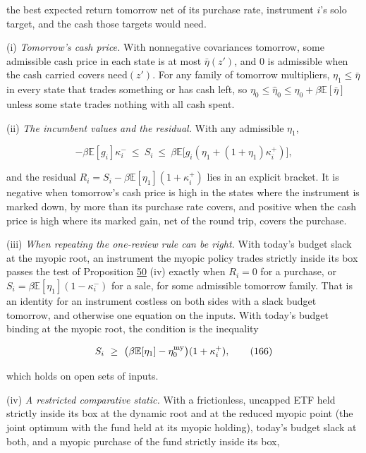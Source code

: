 \documentclass[11pt]{article}
\begin{document}
the best expected return tomorrow net of its purchase rate, instrument
\(i\)'s solo target, and the cash those targets would need.

(i) \emph{Tomorrow's cash price.} With nonnegative covariances tomorrow, some
admissible cash price in each state is at most \(\bar\eta(z')\), and \(0\) is
admissible when the cash carried covers \(\mathrm{need}(z')\). For any family of
tomorrow multipliers, \(\eta_1\leq\bar\eta\) in every state that trades something
or has cash left, so \(\eta_0\leq\hat\eta_0\leq\eta_0+\beta\mathbb E[\bar\eta]\) unless some state trades
nothing with all cash spent.

(ii) \emph{The incumbent values and the residual.} With any admissible \(\eta_1\),

\begin{equation*}
-\beta\mathbb E[g_i]\kappa^-_i\ \leq\ S_i\ \leq\ \beta\mathbb E\bigl[g_i(\eta_1+(1+\eta_1)\kappa^+_i)\bigr],\tag{165}\label{eq:165}
\end{equation*}

and the residual \(R_i=S_i-\beta\mathbb E[\eta_1](1+\kappa^+_i)\) lies in an explicit bracket.
It is negative when tomorrow's cash price is high in the states where
the instrument is marked down, by more than its purchase rate covers,
and positive when the cash price is high where its marked gain, net of
the round trip, covers the purchase.

(iii) \emph{When repeating the one-review rule can be right.} With today's
budget slack at the myopic root, an instrument the myopic policy trades
strictly inside its box passes the test of Proposition \hyperref[res:Proposition-50]{50} (iv) exactly
when \(R_i=0\) for a purchase, or \(S_i=\beta\mathbb E[\eta_1](1-\kappa^-_i)\) for a sale, for some
admissible tomorrow family. That is an identity for an instrument
costless on both sides with a slack budget tomorrow, and otherwise one
equation on the inputs. With today's budget binding at the myopic root,
the condition is the inequality

\begin{equation*}
S_i\ \geq\ \bigl(\beta\mathbb E[\eta_1]-\eta_0^{\rm my}\bigr)(1+\kappa^+_i),\tag{166}\label{eq:166}
\end{equation*}

which holds on open sets of inputs.

(iv) \emph{A restricted comparative static.} With a frictionless, uncapped ETF
held strictly inside its box at the dynamic root and at the reduced
myopic point (the joint optimum with the fund held at its myopic
holding), today's budget slack at both, and a myopic purchase of the
fund strictly inside its box,
\end{document}
